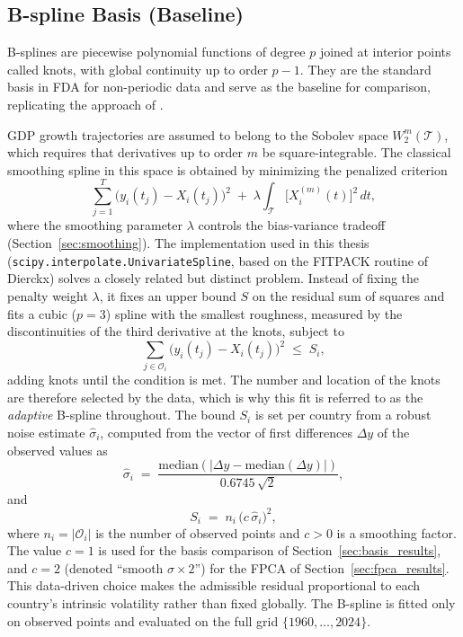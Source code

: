 \subsection{B-spline Basis (Baseline)}
\label{subsec:bspline}

B-splines are piecewise polynomial functions of degree $p$ joined at interior
points called knots, with global continuity up to order $p-1$. They are the
standard basis in FDA for non-periodic data \cite{ramsay2005} and serve as
the baseline for comparison, replicating the approach of \cite{padilla2020}.

GDP growth trajectories are assumed to belong to the Sobolev space
$W_2^m(\mathcal{T})$, which requires that derivatives up to order $m$ be
square-integrable. The classical smoothing spline in this space is obtained by
minimizing the penalized criterion
\begin{equation}
    \sum_{j=1}^{T}\bigl(y_i(t_j) - X_i(t_j)\bigr)^2
    \;+\;
    \lambda\int_{\mathcal{T}}\bigl[X_i^{(m)}(t)\bigr]^2\,dt,
    \label{eq:smoothing_spline}
\end{equation}
where the smoothing parameter $\lambda$ controls the bias-variance tradeoff
(Section~\ref{sec:smoothing}). The implementation used in this thesis
(\texttt{scipy.interpolate.UnivariateSpline}, based on the FITPACK routine of
Dierckx) solves a closely related but distinct problem. Instead of fixing the
penalty weight $\lambda$, it fixes an upper bound $S$ on the residual sum of
squares and fits a cubic ($p = 3$) spline with the smallest roughness, measured
by the discontinuities of the third derivative at the knots, subject to
\begin{equation}
    \sum_{j \in \mathcal{O}_i}\bigl(y_i(t_j) - X_i(t_j)\bigr)^2 \;\leq\; S_i,
    \label{eq:smoothing_condition}
\end{equation}
adding knots until the condition is met. The number and location of the knots
are therefore selected by the data, which is why this fit is referred to as the
\emph{adaptive} B-spline throughout. The bound $S_i$ is set per country from a
robust noise estimate $\hat{\sigma}_i$, computed from the vector of first
differences $\Delta y$ of the observed values as
\begin{equation}
    \hat{\sigma}_i \;=\;
    \frac{\mathrm{median}\!\left(|\Delta y - \mathrm{median}(\Delta y)|\right)}
         {0.6745\,\sqrt{2}},
    \label{eq:sigma_est}
\end{equation}
and
\begin{equation}
    S_i \;=\; n_i\,\bigl(c\,\hat{\sigma}_i\bigr)^2,
    \label{eq:s_bound}
\end{equation}
where $n_i = |\mathcal{O}_i|$ is the number of observed points and $c > 0$ is a
smoothing factor. The value $c = 1$ is used for the basis comparison of
Section~\ref{sec:basis_results}, and $c = 2$ (denoted ``smooth
$\sigma\!\times\!2$'') for the FPCA of Section~\ref{sec:fpca_results}. This
data-driven choice makes the admissible residual proportional to each
country's intrinsic volatility rather than fixed globally. The B-spline is
fitted only on observed points and evaluated on the full grid
$\{1960,\dots,2024\}$.

